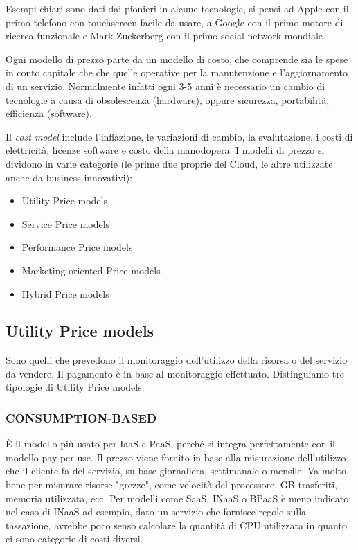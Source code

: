 Esempi chiari sono dati dai pionieri in alcune tecnologie, si pensi ad Apple con il primo telefono con touchscreen facile da usare, a Google con il primo motore di ricerca funzionale e Mark Zuckerberg con il primo social network mondiale.

\vspace{5mm}

Ogni modello di prezzo parte da un modello di costo, che comprende sia le spese in conto capitale che che quelle operative per la manutenzione e l'aggiornamento di un servizio. Normalmente infatti ogni 3-5 anni è necessario un cambio di tecnologie a causa di obsolescenza (hardware), oppure sicurezza, portabilità, efficienza (software).

Il \textit{cost model} include l'inflazione, le variazioni di cambio, la svalutazione, i costi di elettricità, licenze software e costo della manodopera. I modelli di prezzo si dividono in varie categorie (le prime due proprie del Cloud, le altre utilizzate anche da business innovativi):
\begin{itemize}
    \item Utility Price models
    \item Service Price models
    \item Performance Price models
    \item Marketing-oriented Price models
    \item Hybrid Price models
\end{itemize}

\subsection{Utility Price models}
Sono quelli che prevedono il monitoraggio dell'utilizzo della risorsa o del servizio da vendere. Il pagamento è in base al monitoraggio effettuato. Distinguiamo tre tipologie di Utility Price models:

\subsubsection{\textbf{CONSUMPTION-BASED}}
È il modello più usato per IaaS e PaaS, perché si integra perfettamente con il modello pay-per-use. Il prezzo viene fornito in base alla misurazione dell'utilizzo che il cliente fa del servizio, su base giornaliera, settimanale o mensile. Va molto bene per misurare risorse "grezze", come velocità del processore, GB trasferiti, memoria utilizzata, ecc. Per modelli come SaaS, INaaS o BPaaS è meno indicato: nel caso di INaaS ad esempio, dato un servizio che fornisce regole sulla tassazione, avrebbe poco senso calcolare la quantità di CPU utilizzata in quanto ci sono categorie di costi diversi.

